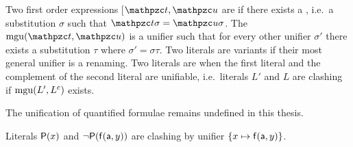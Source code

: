 
\begin{definition}\label{def:unifier}
Two first order expressions [\(\mct, \mcu\) are  if there exists a ,
i.e.~a substitution \( \sigma \) such that \( \mct\sigma=\mcu\sigma \).
The  \( \mgu(\mct,\mcu) \) is a unifier such that
for every other unifier \( \sigma' \) there exists a substitution \( \tau \) where
\( \sigma' = \sigma \tau \).
Two literals are variants if their most general unifier is a renaming.
Two literals are  when the first literal
and the complement of the second literal are unifiable,
i.e.~literals \( L' \) and \( L \) are clashing if \( \operatorname{mgu}(L', L^c) \) exists.
\end{definition}

\begin{remark}
	The unification of quantified formulae remains undefined in this thesis.
\end{remark}

\begin{example}
	Literals \( \mathsf{P}(x) \) and \( \lnot\mathsf{P}(\mathsf{f}(\mathsf{a},y)) \)
	are clashing by unifier \( \{ x\mapsto \mathsf{f}(\mathsf{a},y)\} \).
\end{example}